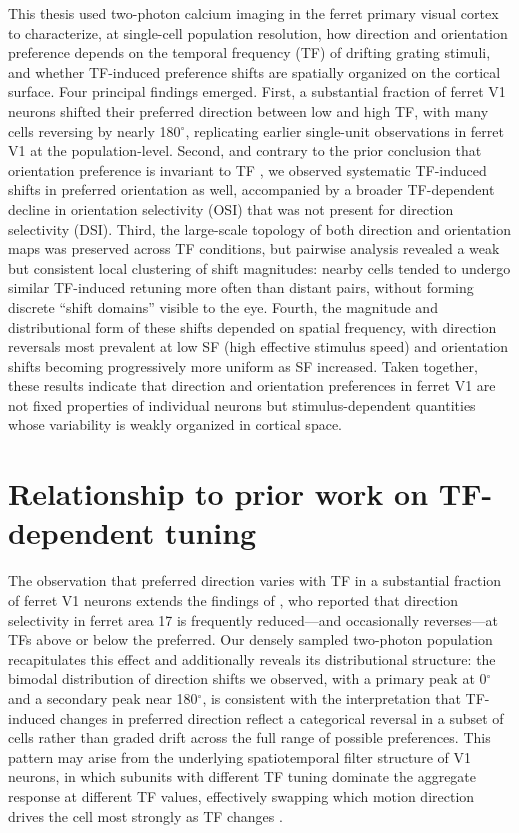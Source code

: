 \documentclass{brandeis-thesis3.3}
\begin{document}
This thesis used two-photon calcium imaging in the
ferret primary visual cortex to characterize, at single-cell
population resolution, how direction and orientation preference
depends on the temporal frequency (TF) of drifting grating
stimuli, and whether TF-induced preference shifts are spatially
organized on the cortical surface. Four principal findings
emerged. First, a substantial fraction of ferret V1 neurons
shifted their preferred direction between low and high TF,
with many cells reversing by nearly 180$^\circ$, replicating 
earlier single-unit observations in ferret V1 \citep{Moore2005} at 
the population-level. Second, and contrary to the prior
conclusion that orientation preference is invariant to TF
\citep{Moore2005}, we observed systematic TF-induced shifts in
preferred orientation as well, accompanied by a broader
TF-dependent decline in orientation selectivity (OSI) that was
not present for direction selectivity (DSI). Third, the
large-scale topology of both direction and orientation maps was
preserved across TF conditions, but pairwise analysis revealed
a weak but consistent local clustering of shift magnitudes:
nearby cells tended to undergo similar TF-induced retuning more
often than distant pairs, without forming discrete ``shift
domains'' visible to the eye. Fourth, the magnitude and
distributional form of these shifts depended on spatial
frequency, with direction reversals most prevalent at low SF
(high effective stimulus speed) and orientation shifts becoming
progressively more uniform as SF increased. Taken together,
these results indicate that direction and orientation
preferences in ferret V1 are not fixed properties of individual
neurons but stimulus-dependent quantities whose variability is
weakly organized in cortical space.

\section{Relationship to prior work on TF-dependent tuning}

The observation that preferred direction varies with TF in a
substantial fraction of ferret V1 neurons extends the findings
of \citet{Moore2005}, who reported that direction selectivity
in ferret area 17 is frequently reduced---and occasionally
reverses---at TFs above or below the preferred. Our densely
sampled two-photon population recapitulates this effect and
additionally reveals its distributional structure: the
bimodal distribution of direction shifts we observed, with a
primary peak at 0$^\circ$ and a secondary peak near
180$^\circ$, is consistent with the interpretation that
TF-induced changes in preferred direction reflect a
categorical reversal in a subset of cells rather than graded
drift across the full range of possible preferences. This
pattern may arise from the underlying spatiotemporal filter
structure of V1 neurons, in which subunits with different TF
tuning dominate the aggregate response at different TF
values, effectively swapping which motion direction drives
the cell most strongly as TF changes
\citep{Adelson1985, Priebe2006}.
\end{document}
